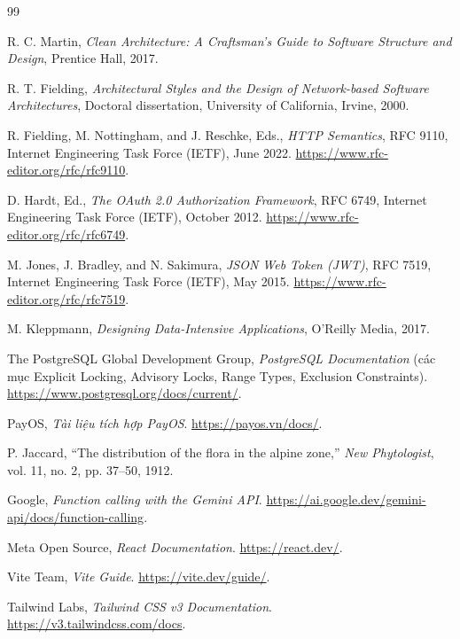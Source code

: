 \begin{thebibliography}{99}

R. C. Martin, \textit{Clean Architecture: A Craftsman's Guide to Software Structure and Design}, Prentice Hall, 2017.

R. T. Fielding, \textit{Architectural Styles and the Design of Network-based Software Architectures}, Doctoral dissertation, University of California, Irvine, 2000.

R. Fielding, M. Nottingham, and J. Reschke, Eds., \textit{HTTP Semantics}, RFC 9110, Internet Engineering Task Force (IETF), June 2022. \url{https://www.rfc-editor.org/rfc/rfc9110}.

D. Hardt, Ed., \textit{The OAuth 2.0 Authorization Framework}, RFC 6749, Internet Engineering Task Force (IETF), October 2012. \url{https://www.rfc-editor.org/rfc/rfc6749}.

M. Jones, J. Bradley, and N. Sakimura, \textit{JSON Web Token (JWT)}, RFC 7519, Internet Engineering Task Force (IETF), May 2015. \url{https://www.rfc-editor.org/rfc/rfc7519}.

M. Kleppmann, \textit{Designing Data-Intensive Applications}, O'Reilly Media, 2017.

The PostgreSQL Global Development Group, \textit{PostgreSQL Documentation} (các mục Explicit Locking, Advisory Locks, Range Types, Exclusion Constraints). \url{https://www.postgresql.org/docs/current/}.

PayOS, \textit{Tài liệu tích hợp PayOS}. \url{https://payos.vn/docs/}.

P. Jaccard, ``The distribution of the flora in the alpine zone,'' \textit{New Phytologist}, vol. 11, no. 2, pp. 37--50, 1912.

Google, \textit{Function calling with the Gemini API}. \url{https://ai.google.dev/gemini-api/docs/function-calling}.

Meta Open Source, \textit{React Documentation}. \url{https://react.dev/}.

Vite Team, \textit{Vite Guide}. \url{https://vite.dev/guide/}.

Tailwind Labs, \textit{Tailwind CSS v3 Documentation}. \url{https://v3.tailwindcss.com/docs}.


\end{thebibliography}
